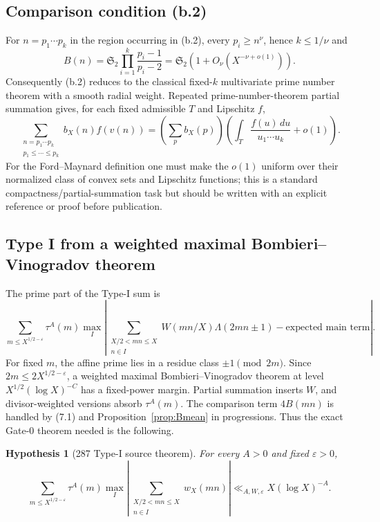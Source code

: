 \documentclass[11pt]{article}
\newtheorem{hypothesis}[theorem]{Hypothesis}
\theoremstyle{definition}
\theoremstyle{remark}
\newcommand{\1}{\mathbf 1}
\begin{document}
\subsection{Comparison condition (b.2)}

For $n=p_1\cdots p_k$ in the region occurring in (b.2), every $p_i\ge n^\nu$, hence $k\le1/\nu$ and
\[
 B(n)=\mathfrak S_2\prod_{i=1}^k\frac{p_i-1}{p_i-2}
 =\mathfrak S_2(1+O_\nu(X^{-\nu+o(1)})).
\]
Consequently (b.2) reduces to the classical fixed-$k$ multivariate prime number theorem with a smooth radial
weight.  Repeated prime-number-theorem partial summation gives, for each fixed admissible $T$ and Lipschitz $f$,
\[
 \sum_{\substack{n=p_1\cdots p_k\\p_1\le\cdots\le p_k}}
 b_X(n)f(v(n))
 =\left(\sum_p b_X(p)\right)
 \left(\int_T\frac{f(u)\,du}{u_1\cdots u_k}+o(1)\right).
\tag{G0-b2}
\]
For the Ford--Maynard definition one must make the $o(1)$ uniform over their normalized class of convex sets
and Lipschitz functions; this is a standard compactness/partial-summation task but should be written with an
explicit reference or proof before publication.

\subsection{Type I from a weighted maximal Bombieri--Vinogradov theorem}

The prime part of the Type-I sum is
\[
 \sum_{m\le X^{1/2-\varepsilon}}\tau^A(m)
 \max_I\left|
 \sum_{\substack{X/2<mn\le X\\n\in I}}
 W(mn/X)\Lambda(2mn\pm1)-\text{expected main term}\right|.
\]
For fixed $m$, the affine prime lies in a residue class $\pm1\pmod{2m}$.  Since
$2m\le2X^{1/2-\varepsilon}$, a weighted maximal Bombieri--Vinogradov theorem at level
$X^{1/2}(\log X)^{-C}$ has a fixed-power margin.  Partial summation inserts $W$, and divisor-weighted versions
absorb $\tau^A(m)$.  The comparison term $4B(mn)$ is handled by (7.1) and Proposition~\ref{prop:Bmean} in
progressions.  Thus the exact Gate-0 theorem needed is the following.

\begin{hypothesis}[287 Type-I source theorem]\label{hyp:G0I}
For every $A>0$ and fixed $\varepsilon>0$,
\[
 \boxed{
 \sum_{m\le X^{1/2-\varepsilon}}\tau^A(m)
 \max_I\left|\sum_{\substack{X/2<mn\le X\\n\in I}}w_X(mn)\right|
 \ll_{A,W,\varepsilon}X(\log X)^{-A}.}
\tag{287-I}
\]
\end{hypothesis}
\end{document}
